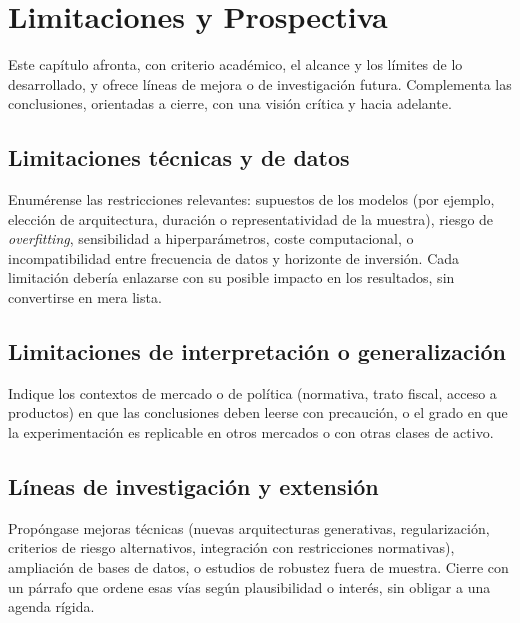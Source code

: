 \chapter{Limitaciones y Prospectiva}

Este capítulo afronta, con criterio académico, el alcance y los límites de lo desarrollado, y ofrece líneas de mejora o de investigación futura. Complementa las conclusiones, orientadas a cierre, con una visión crítica y hacia adelante.

\section{Limitaciones técnicas y de datos}
Enumérense las restricciones relevantes: supuestos de los modelos (por ejemplo, elección de arquitectura, duración o representatividad de la muestra), riesgo de \textit{overfitting}, sensibilidad a hiperparámetros, coste computacional, o incompatibilidad entre frecuencia de datos y horizonte de inversión. Cada limitación debería enlazarse con su posible impacto en los resultados, sin convertirse en mera lista.

\section{Limitaciones de interpretación o generalización}
Indique los contextos de mercado o de política (normativa, trato fiscal, acceso a productos) en que las conclusiones deben leerse con precaución, o el grado en que la experimentación es replicable en otros mercados o con otras clases de activo.

\section{Líneas de investigación y extensión}
Propóngase mejoras técnicas (nuevas arquitecturas generativas, regularización, criterios de riesgo alternativos, integración con restricciones normativas), ampliación de bases de datos, o estudios de robustez fuera de muestra. Cierre con un párrafo que ordene esas vías según plausibilidad o interés, sin obligar a una agenda rígida.
